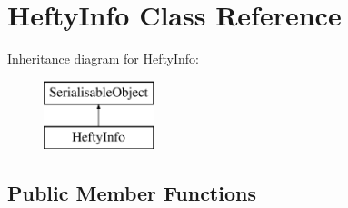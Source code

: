 \hypertarget{classHeftyInfo}{\section{Hefty\-Info Class Reference}
\label{classHeftyInfo}
}
Inheritance diagram for Hefty\-Info\-:\begin{figure}[H]
\begin{center}
\leavevmode
\includegraphics[height=2.000000cm]{classHeftyInfo}
\end{center}
\end{figure}
\subsection*{Public Member Functions}
